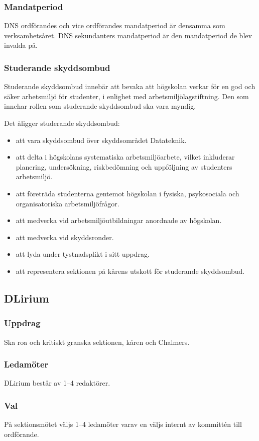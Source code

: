\subsubsection{Mandatperiod}
DNS ordförandes och vice ordförandes mandatperiod är densamma som verksamhetsåret. DNS sekundanters mandatperiod är den mandatperiod de blev invalda på.
\subsubsection{Studerande skyddsombud}
Studerande skyddsombud innebär att bevaka att högskolan verkar för en god
och säker arbetsmiljö för studenter, i enlighet med arbetsmiljölagstiftning. Den
som innehar rollen som studerande skyddsombud ska vara myndig.

Det åligger studerande skyddsombud:
\begin{itemize}
  \item att vara skyddsombud över skyddsområdet Datateknik.
  \item att delta i högskolans systematiska arbetsmiljöarbete, vilket
  inkluderar planering, undersökning, riskbedömning och uppföljning av
  studenters arbetsmiljö.
  \item att företräda studenterna gentemot högskolan i fysiska, psykosociala och
  organisatoriska arbetsmiljöfrågor.
  \item att medverka vid arbetsmiljöutbildningar anordnade av högskolan.
  \item att medverka vid skyddsronder.
  \item att lyda under tystnadsplikt i sitt uppdrag.
  \item att representera sektionen på kårens utskott för studerande skyddsombud.
\end{itemize}

\subsection{DLirium}
\subsubsection{Uppdrag}
Ska roa och kritiskt granska sektionen, kåren och Chalmers. 
\subsubsection{Ledamöter}
DLirium består av 1--4 redaktörer.
\subsubsection{Val}
På sektionsmötet väljs 1--4 ledamöter varav en väljs internt av kommittén till ordförande.
